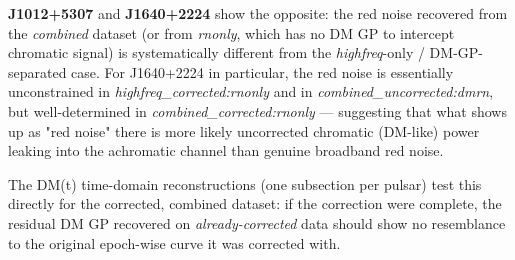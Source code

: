 \documentclass[11pt]{article}
\begin{document}
\textbf{J1012+5307} and \textbf{J1640+2224} show the opposite: the red noise
recovered from the \emph{combined} dataset (or from \emph{rnonly}, which has
no DM GP to intercept chromatic signal) is systematically different from the
\emph{highfreq}-only / DM-GP-separated case. For J1640+2224 in particular,
the red noise is essentially unconstrained in \emph{highfreq\_corrected:rnonly}
and in \emph{combined\_uncorrected:dmrn}, but well-determined in
\emph{combined\_corrected:rnonly} --- suggesting that what shows up as "red
noise" there is more likely uncorrected chromatic (DM-like) power leaking
into the achromatic channel than genuine broadband red noise.

The DM(t) time-domain reconstructions (one subsection per pulsar) test this
directly for the corrected, combined dataset: if the correction were
complete, the residual DM GP recovered on \emph{already-corrected} data
should show no resemblance to the original epoch-wise curve it was
corrected with.
\end{document}
